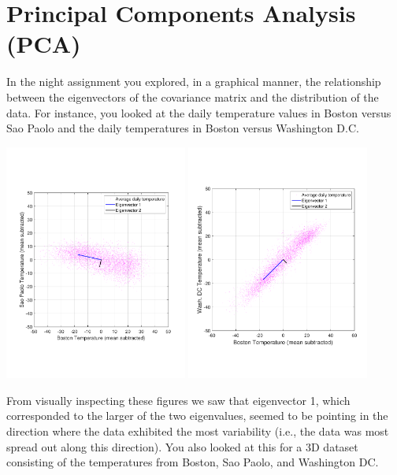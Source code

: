 \section{Principal Components Analysis (PCA)}

In the night assignment you explored, in a graphical manner, the relationship between the eigenvectors of the covariance matrix and the distribution of the data.  For instance, you looked at the daily temperature values in Boston versus Sao Paolo and the daily temperatures in Boston versus Washington D.C.

\begin{center}
\includegraphics[width=0.45\textwidth]{FacesNight5/figs/BostonSaoPaoloCentered.pdf}
\includegraphics[width=0.45\textwidth]{FacesNight5/figs/BostonWashingtonCentered.pdf}
\label{figBostonWashington}
\end{center}

From visually inspecting these figures we saw that eigenvector 1, which corresponded to the larger of the two eigenvalues, seemed to be pointing in the direction where the data exhibited the most variability (i.e., the data was most spread out along this direction).  You also looked at this for a 3D dataset consisting of the temperatures from Boston, Sao Paolo, and Washington DC.


